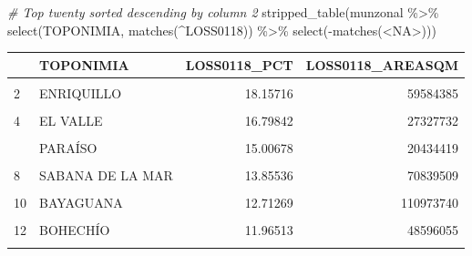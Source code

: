 \documentclass[10pt,landscape,a3paper]{article}
\newenvironment{Shaded}{\begin{snugshade}}{\end{snugshade}}
\newcommand{\CommentTok}[1]{\textcolor[rgb]{0.56,0.35,0.01}{\textit{#1}}}
\newcommand{\FunctionTok}[1]{\textcolor[rgb]{0.00,0.00,0.00}{#1}}
\newcommand{\NormalTok}[1]{#1}
\newcommand{\SpecialCharTok}[1]{\textcolor[rgb]{0.00,0.00,0.00}{#1}}
\newcommand{\StringTok}[1]{\textcolor[rgb]{0.31,0.60,0.02}{#1}}
\begin{document}
\begin{Shaded}
\begin{Highlighting}[]
\CommentTok{\# Top twenty sorted descending by column 2}
\FunctionTok{stripped\_table}\NormalTok{(munzonal }\SpecialCharTok{\%\textgreater{}\%} \FunctionTok{select}\NormalTok{(TOPONIMIA, }\FunctionTok{matches}\NormalTok{(}\StringTok{\textquotesingle{}\^{}LOSS0118\textquotesingle{}}\NormalTok{)) }\SpecialCharTok{\%\textgreater{}\%} \FunctionTok{select}\NormalTok{(}\SpecialCharTok{{-}}\FunctionTok{matches}\NormalTok{(}\StringTok{\textquotesingle{}\textless{}NA\textgreater{}\textquotesingle{}}\NormalTok{)))}
\end{Highlighting}
\end{Shaded}

\begin{table}[H]
\centering
\begin{tabular}[t]{llrr}
\toprule
  & TOPONIMIA & LOSS0118\_PCT & LOSS0118\_AREASQM\\
\midrule
\cellcolor{lightgray}{1} & \cellcolor{lightgray}{LAS TERRENAS} & \cellcolor{lightgray}{18.60592} & \cellcolor{lightgray}{20803822}\\
2 & ENRIQUILLO & 18.15716 & 59584385\\
\cellcolor{lightgray}{3} & \cellcolor{lightgray}{VILLA ISABELA} & \cellcolor{lightgray}{17.06917} & \cellcolor{lightgray}{36146513}\\
4 & EL VALLE & 16.79842 & 27327732\\
\cellcolor{lightgray}{5} & \cellcolor{lightgray}{LA CIÉNAGA} & \cellcolor{lightgray}{15.10272} & \cellcolor{lightgray}{17650896}\\
\addlinespace
6 & PARAÍSO & 15.00678 & 20434419\\
\cellcolor{lightgray}{7} & \cellcolor{lightgray}{SABANA GRANDE DE BOYÁ} & \cellcolor{lightgray}{14.32006} & \cellcolor{lightgray}{75546364}\\
8 & SABANA DE LA MAR & 13.85536 & 70839509\\
\cellcolor{lightgray}{9} & \cellcolor{lightgray}{LOMA DE CABRERA} & \cellcolor{lightgray}{13.27824} & \cellcolor{lightgray}{32730761}\\
10 & BAYAGUANA & 12.71269 & 110973740\\
\addlinespace
\cellcolor{lightgray}{11} & \cellcolor{lightgray}{VILLA LOS ALMÁCIGOS} & \cellcolor{lightgray}{12.49025} & \cellcolor{lightgray}{25906886}\\
12 & BOHECHÍO & 11.96513 & 48596055\\
\cellcolor{lightgray}{13} & \cellcolor{lightgray}{RESTAURACIÓN} & \cellcolor{lightgray}{11.95832} & \cellcolor{lightgray}{33003809}\\

\end{tabular}
\end{table}
\end{document}
